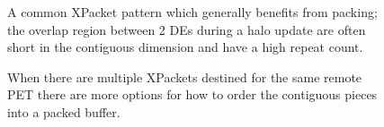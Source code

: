 \begin{enumerate}
\begin{center}
\begin{figure}
\caption{A common XPacket pattern which generally benefits from
packing; the overlap region between 2 DEs during a halo update
are often short in the contiguous dimension and have a high 
repeat count.}
\label{fig:xpacketpack}
\end{figure}
\end{center}

\begin{center}
\begin{figure}
\caption{When there are multiple XPackets destined for the
same remote PET there are more options for how to order the
contiguous pieces into a packed buffer.}
\label{fig:xpacket2up}
\end{figure}
\end{center}


\end{enumerate}
